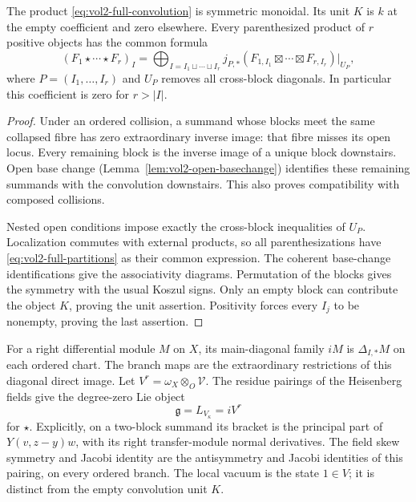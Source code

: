 \begin{proposition}\label{prop:vol2-full-convolution}
The product \eqref{eq:vol2-full-convolution} is symmetric monoidal.
Its unit $K$ is $k$ at the empty coefficient and zero elsewhere.
Every parenthesized product of $r$ positive objects has the common
formula
\begin{equation}\label{eq:vol2-full-partitions}
 (F_1\star\cdots\star F_r)_I
 =\bigoplus_{I=I_1\sqcup\cdots\sqcup I_r}
      j_{P,*}(F_{1,I_1}\boxtimes\cdots\boxtimes F_{r,I_r})|_{U_P},
\end{equation}
where $P=(I_1,\ldots,I_r)$ and $U_P$ removes all cross-block
diagonals. In particular this coefficient is zero for $r>|I|$.
\end{proposition}
\begin{proof}
Under an ordered collision, a summand whose blocks meet the same
collapsed fibre has zero extraordinary inverse image: that fibre
misses its open locus. Every remaining block is the inverse image
of a unique block downstairs. Open base change
(Lemma~\ref{lem:vol2-open-basechange}) identifies these remaining
summands with the convolution downstairs. This also proves
compatibility with composed collisions.

Nested open conditions impose exactly the cross-block inequalities
of $U_P$. Localization commutes with external products, so all
parenthesizations have \eqref{eq:vol2-full-partitions} as their
common expression. The coherent base-change identifications give
the associativity diagrams. Permutation of the blocks gives the
symmetry with the usual Koszul signs. Only an empty block can
contribute the object $K$, proving the unit assertion. Positivity
forces every $I_j$ to be nonempty, proving the last assertion.
\end{proof}

For a right differential module $M$ on $X$, its main-diagonal family
$iM$ is $\Delta_{I,*}M$ on each ordered chart. The branch maps are
the extraordinary restrictions of this diagonal direct image.
Let $V^r=\omega_X\otimes_O\mathcal V$. The residue pairings of the
Heisenberg fields give the degree-zero Lie object
\[
 \mathfrak g=L_{V_\kappa}=iV^r
\]
for $\star$. Explicitly, on a two-block summand its bracket is the
principal part of $Y(v,z-y)w$, with its right transfer-module
normal derivatives. The field skew symmetry and Jacobi identity
are the antisymmetry and Jacobi identities of this pairing, on
every ordered branch. The local vacuum is the state $1\in V$;
it is distinct from the empty convolution unit $K$.

